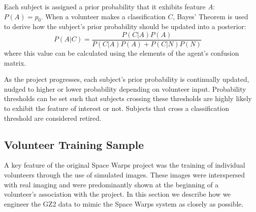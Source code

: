 \documentclass[twocolumn]{aastex6}
\newcommand{\A}{\textit{A}}
\begin{document}
Each subject is assigned a prior probability that it exhibits feature \A: $P(A) = p_0$. 
When a volunteer makes a classification $C$, Bayes' Theorem is used to derive how 
the subject's prior probability should be updated into a posterior: 
\begin{equation}
P(A|C) = \frac{ P(C|A) P(A) }{P(C|A) P(A) + P(C|N) P(N)}
\end{equation}
where this value can be calculated using the elements of the agent's 
confusion matrix. 


As the project progresses, each subject's prior probability is continually updated,
 nudged to higher or lower probability depending on volunteer input.
Probability thresholds can be set such that subjects crossing these thresholds 
are highly likely to exhibit the feature of interest or not. Subjects that
cross a classification threshold are considered retired. 



\subsection{Volunteer Training Sample}\label{sec: training sample}

A key feature of the original Space Warps project was the training of 
individual volunteers through the use of simulated images.
These images were interspersed with real imaging and were 
predominantly shown at the beginning of a volunteer's association with the project. 
In this section we describe how we engineer the GZ2 data to mimic the Space 
Warps system as closely as possible.
\end{document}
